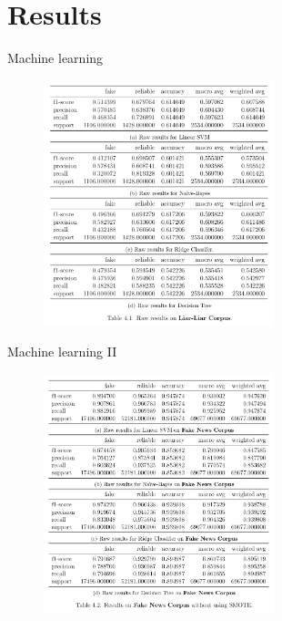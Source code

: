 \documentclass{beamer}
\begin{document}
	\section{Results}
	\begin{frame}{Machine learning}
		\begin{figure}
		\centering
			\includegraphics[width=0.6\textwidth]{res1.png}
		\end{figure}
	\end{frame}
	\begin{frame}{Machine learning II}
		\begin{figure}
		\centering
			\includegraphics[width=0.6\textwidth]{res2.png}
		\end{figure}
		
	\end{frame}
\end{document}
